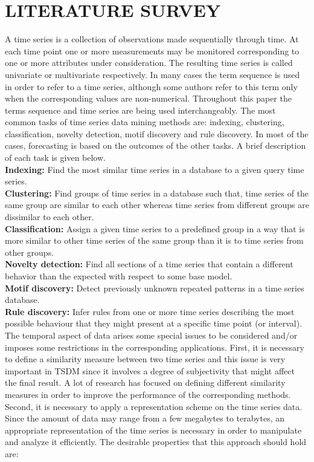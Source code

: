 \documentclass[12pt]{report}
\begin{document}
\section{LITERATURE SURVEY}
A time series is a collection of observations made sequentially through time. At each time point one or more measurements may be monitored corresponding to one or more attributes under consideration. The resulting time series is called univariate or multivariate respectively. In many cases the term sequence is used in order to refer to a time series, although some authors refer to this term only when the corresponding values are non-numerical. Throughout this paper the terms sequence and time series are being used interchangeably.
The most common tasks of time series data mining methods are: indexing, clustering, classification, novelty detection, motif discovery and rule discovery. In most of the cases, forecasting is based on the outcomes of the other tasks. A brief description of each task is given below.\\
\textbf{Indexing:} Find the most similar time series in a database to a given query time series.\\
\textbf{Clustering:} Find groups of time series in a database such that, time series of the same group are similar to each other whereas time series from different groups are dissimilar to each other.\\
\textbf{Classification:} Assign a given time series to a predefined group in a way that is more similar to other time series of the same group than it is to time series from other groups.\\
\textbf{Novelty detection:} Find all sections of a time series that contain a different behavior than the expected with respect to some base model.\\
\textbf{Motif discovery:} Detect previously unknown repeated patterns in a time series database.\\
\textbf{Rule discovery:} Infer rules from one or more time series describing the most possible behaviour that they might present at a specific time point (or interval).\\
  The temporal aspect of data arises some special issues to be considered and/or imposes some restrictions in the corresponding applications. First, it is necessary to define a similarity measure between two time series and this issue is very important in TSDM since it involves a degree of subjectivity that might affect the final result. A lot of research has focused on defining different similarity measures in order to improve the performance of the corresponding methods. Second, it is necessary to apply a representation scheme on the time series data. Since the amount of data may range from a few megabytes to terabytes, an appropriate representation of the time series is necessary in order to manipulate and analyze it efficiently. The desirable properties that this approach should hold are: 
\end{document}
